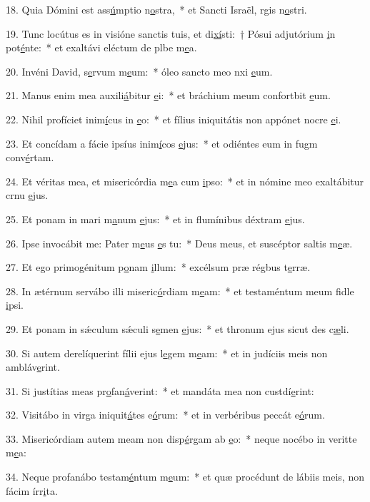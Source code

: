 18. Quia Dómini est ass\uline{ú}mptio n\uline{o}stra,~* et Sancti Israël, rgis n\uline{o}stri.\par 
19. Tunc locútus es in visióne sanctis tuis, et di\uline{xí}sti:~† Pósui adjutórium \uline{i}n pot\uline{é}nte:~* et exaltávi eléctum de plbe m\uline{e}a.\par 
20. Invéni David, s\uline{e}rvum m\uline{e}um:~* óleo sancto meo nxi \uline{e}um.\par 
21. Manus enim mea auxili\uline{á}bitur \uline{e}i:~* et bráchium meum confortbit \uline{e}um.\par 
22. Nihil profíciet inim\uline{í}cus in \uline{e}o:~* et fílius iniquitátis non appónet nocre \uline{e}i.\par 
23. Et concídam a fácie ipsíus inim\uline{í}cos \uline{e}jus:~* et odiéntes eum in fugm conv\uline{é}rtam.\par 
24. Et véritas mea, et misericórdia m\uline{e}a cum \uline{i}pso:~* et in nómine meo exaltábitur crnu \uline{e}jus.\par 
25. Et ponam in mari m\uline{a}num \uline{e}jus:~* et in flumínibus déxtram \uline{e}jus.\par 
26. Ipse invocábit me: Pater m\uline{e}us \uline{e}s tu:~* Deus meus, et suscéptor saltis m\uline{e}æ.\par 
27. Et ego primogénitum p\uline{o}nam \uline{i}llum:~* excélsum præ régbus t\uline{e}rræ.\par 
28. In ætérnum servábo illi miseric\uline{ó}rdiam m\uline{e}am:~* et testaméntum meum fidle \uline{i}psi.\par 
29. Et ponam in sǽculum sǽculi s\uline{e}men \uline{e}jus:~* et thronum ejus sicut des c\uline{æ}li.\par 
30. Si autem derelíquerint fílii ejus l\uline{e}gem m\uline{e}am:~* et in judíciis meis non ambláv\uline{e}rint.\par 
31. Si justítias meas pr\uline{o}fan\uline{á}verint:~* et mandáta mea non custdí\uline{e}rint:\par 
32. Visitábo in virga iniquit\uline{á}tes e\uline{ó}rum:~* et in verbéribus peccát e\uline{ó}rum.\par 
33. Misericórdiam autem meam non disp\uline{é}rgam ab \uline{e}o:~* neque nocébo in veritte m\uline{e}a:\par 
34. Neque profanábo testam\uline{é}ntum m\uline{e}um:~* et quæ procédunt de lábiis meis, non fácim írr\uline{i}ta.\par 
